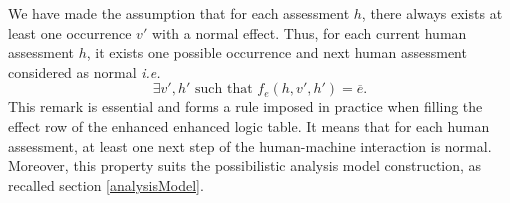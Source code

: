 \begin{table}[t!]
  \centering
{}
\caption{Enhanced logic table of the logic table \ref{trivialLogicTable}:
occurrences $v_A$ and $v_C$ have both a non-nominal effect, described respectively by columns $5$ and $4$.
Each column represent a pair (situation, behaviour), and effect row represents the effect plausibility label.
Last row assigns a possibility degree to each effect (see section \ref{subsec:possibilisticModel}).
} \label{trivialLogicTableEffect}%
\end{table}%


We have made the assumption that for each assessment $h$, there always exists at least one occurrence $v'$ with a normal effect.
Thus, for each current human assessment $h$, it exists
one possible occurrence and next human assessment considered as normal \textit{i.e.}
\begin{equation}
\exists v', h' \mbox{ such that } f_e(h,v',h')=\overline{e}. 
\label{distribsNaturallyNormalized}
\end{equation}
This remark is essential and forms a rule imposed in practice when filling
the effect row of the enhanced enhanced logic table.
It means that for each human assessment, at least one next step of the 
human-machine interaction is normal. 
Moreover, this property suits
the possibilistic analysis model construction, 
as recalled section \ref{analysisModel}.

